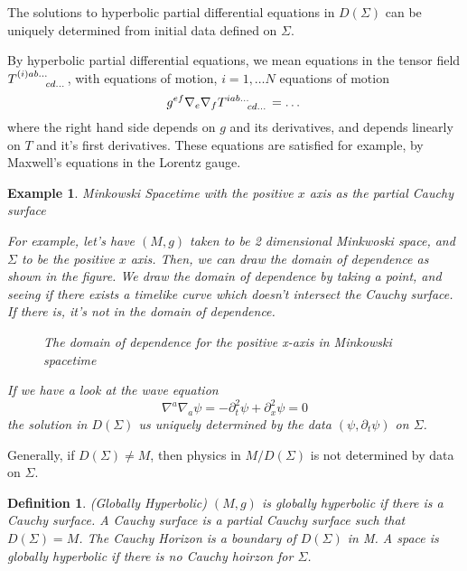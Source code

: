 \documentclass[11pt, oneside]{article}   	%
\theoremstyle{slanted}
\newtheorem{example}{Example}
\newtheorem*{defn}{Definition}
\begin{document}
The solutions to hyperbolic 
partial differential equations 
in $ D \left( \Sigma  \right)  $ 
can be uniquely determined from 
initial data defined on $ \Sigma $.

By hyperbolic partial differential equations, 
we mean equations in the tensor field 
$ T \indices{ ^{ \left( i  \right) a b \dots } 
_{ cd \dots } }  $, with equations 
of motion, $ i  = 1 , \dots N $
equations of motion 
\[
g ^{ ef } \nabla _ e \nabla _ f T \indices{ ^{ i ab \dots } 
_{ cd \dots } }  = \dots  
\] where the right hand side depends on $ g $ and its derivatives, 
and depends linearly on $ T  $ and it's first derivatives.
These equations are satisfied for example, 
by Maxwell's equations in the Lorentz gauge. 


\begin{example}{Minkowski Spacetime with the positive 
	$ x  $ axis as the partial Cauchy surface}

	For example, let's have $ \left( M ,g  \right)  $ taken to 
be 2 dimensional Minkwoski space, and 
$ \Sigma $ to be the positive $ x $ axis. 
Then, we can draw the domain of 
dependence as shown in the figure.
We draw the domain of dependence 
by taking a point, and seeing 
if there exists a timelike 
curve which doesn't intersect the Cauchy surface. 
If there is, it's not in the domain of dependence. 

\begin{figure}[htpb]
	\centering
	
	\caption{The domain of dependence 
	for the positive x-axis in Minkowski spacetime}%
	\label{fig:}
\end{figure} 

If we have a look at the wave equation 
\[
 \nabla ^ a \nabla _ a \psi  =  - \partial  _ t ^ 2 \psi + 
 \partial _ x ^ 2 \psi  = 0 
\] the solution in $ D \left( \Sigma  \right)  $ 
us uniquely determined by the data 
$ \left( \psi , \partial  _ t \psi  \right)   $ on 
$ \Sigma $. 
\end{example}


Generally, 
if $ D \left( \Sigma  \right)  \neq M $, then physics 
in $ M / D \left( \Sigma  \right) $ is not 
determined by data on $ \Sigma $. 

\begin{defn}{(Globally Hyperbolic)}
	$ \left( M , g  \right)  $ is 
	globally hyperbolic if there is a Cauchy surface. 
	A Cauchy surface is a partial Cauchy surface 
	such that $ D \left( \Sigma  \right)   = M $. 
	The Cauchy Horizon is a boundary of $ D \left( \Sigma  \right)  $ 
	in M. A space is globally hyperbolic if there is no Cauchy hoirzon for 
	$ \Sigma  $. 
\end{defn}
\end{document}

